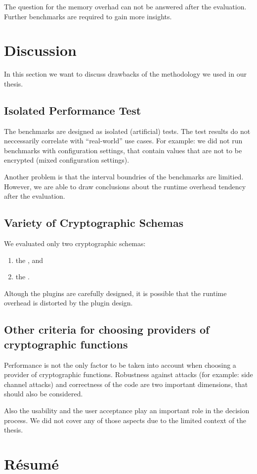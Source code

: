 The question for the memory overhad can not be answered after the evaluation.
Further benchmarks are required to gain more insights.

\section{Discussion}

In this section we want to discuss drawbacks of the methodology we used in our thesis.

	\subsection{Isolated Performance Test}

The benchmarks are designed as isolated (artificial) tests.
The test results do not neccessarily correlate with ``real-world'' use cases.
For example: we did not run benchmarks with configuration settings, that contain values that are not to be encrypted (mixed configuration settings).

Another problem is that the interval boundries of the benchmarks are limitied.
However, we are able to draw conclusions about the runtime overhead tendency after the evaluation.

	\subsection{Variety of Cryptographic Schemas}

We evaluated only two cryptographic schemas:
\begin{enumerate}
\item the \crypto, and
\item the \fcrypt.
\end{enumerate}

Altough the plugins are carefully designed, it is possible that the runtime overhead is distorted by the plugin design.

	\subsection{Other criteria for choosing providers of cryptographic functions}

Performance is not the only factor to be taken into account when choosing a provider of cryptographic functions.
Robustness against attacks (for example: side channel attacks) and correctness of the code are two important dimensions, that should also be considered.

Also the usability and the user acceptance play an important role in the decision process.
We did not cover any of those aspects due to the limited context of the thesis.

\section{Résumé}

